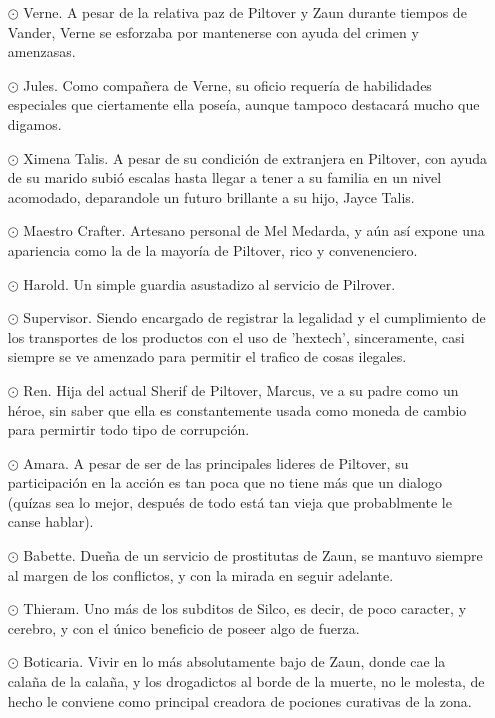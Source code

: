 \documentclass[11pt,A5]{article}
\begin{document}
\begin{itemize}
    \item[$\odot$] Verne. A pesar de la relativa paz de Piltover y Zaun durante tiempos de Vander, Verne se esforzaba por mantenerse con ayuda del crimen y amenzasas.
    \item[$\odot$] Jules. Como compañera de Verne, su oficio requería de habilidades especiales que ciertamente ella poseía, aunque tampoco destacará mucho que digamos.
    \item[$\odot$] Ximena Talis. A pesar de su condición de extranjera en Piltover, con ayuda de su marido subió escalas hasta llegar a tener a su familia en un nivel acomodado, deparandole un futuro brillante a su hijo, Jayce Talis.
    \item[$\odot$] Maestro Crafter. Artesano personal de Mel Medarda, y aún así expone una apariencia como la de la mayoría de Piltover, rico y convenenciero.
    \item[$\odot$] Harold. Un simple guardia asustadizo al servicio de Pilrover.
    \item[$\odot$] Supervisor. Siendo encargado de registrar la legalidad y el cumplimiento de los transportes de los productos con el uso de 'hextech', sinceramente, casi siempre se ve amenzado para permitir el trafico de cosas ilegales.	
    \item[$\odot$] Ren. Hija del actual Sherif de Piltover, Marcus, ve a su padre como un héroe, sin saber que ella es constantemente usada como moneda de cambio para permirtir todo tipo de corrupción.
    \item[$\odot$] Amara. A pesar de ser de las principales lideres de Piltover, su participación en la acción es tan poca que no tiene más que un dialogo (quízas sea lo mejor, después de todo está tan vieja que probablmente le canse hablar).
    \item[$\odot$] Babette. Dueña de un servicio de prostitutas de Zaun, se mantuvo siempre al margen de los conflictos, y con la mirada en seguir adelante.
    \item[$\odot$] Thieram. Uno más de los subditos de Silco, es decir, de poco caracter, y cerebro, y con el único beneficio de poseer algo de fuerza.
    \item[$\odot$] Boticaria. Vivir en lo más absolutamente bajo de Zaun, donde cae la calaña de la calaña, y los drogadictos al borde de la muerte, no le molesta, de hecho le conviene como principal creadora de pociones curativas de la zona.
\end{itemize}
\end{document}
